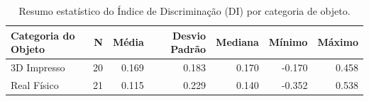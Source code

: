 \begin{table}[tbp]
    \caption{Resumo estatístico do Índice de Discriminação (DI) por categoria de objeto.}
    \label{tab:resumo_di}
    \begin{tabular}{lrrrrrr}
        \toprule
        Categoria do Objeto & N  & Média & Desvio Padrão & Mediana & Mínimo & Máximo \\
        \midrule
        3D Impresso         & 20 & 0.169 & 0.183         & 0.170   & -0.170 & 0.458  \\
        Real Físico         & 21 & 0.115 & 0.229         & 0.140   & -0.352 & 0.538  \\
        \bottomrule
    \end{tabular}
\end{table}
